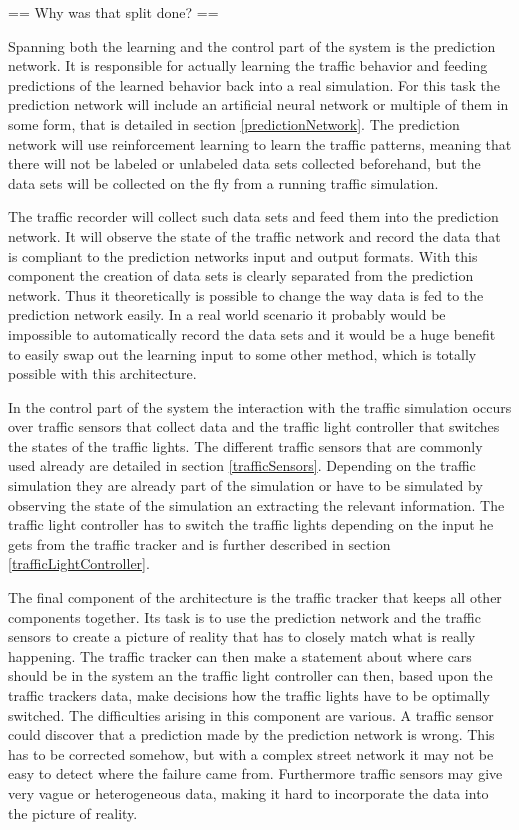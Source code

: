== Why was that split done? ==

Spanning both the learning and the control part of the system is the prediction network. It is responsible for actually learning the traffic behavior and feeding predictions of the learned behavior back into a real simulation. For this task the prediction network will include an artificial neural network or multiple of them in some form, that is detailed in section \ref{predictionNetwork}. The prediction network will use reinforcement learning to learn the traffic patterns, meaning that there will not be labeled or unlabeled data sets collected beforehand, but the data sets will be collected on the fly from a running traffic simulation.

The traffic recorder will collect such data sets and feed them into the prediction network. It will observe the state of the traffic network and record the data that is compliant to the prediction networks input and output formats. With this component the creation of data sets is clearly separated from the prediction network. Thus it theoretically is possible to change the way data is fed to the prediction network easily. In a real world scenario it probably would be impossible to automatically record the data sets and it would be a huge benefit to easily swap out the learning input to some other method, which is totally possible with this architecture.

In the control part of the system the interaction with the traffic simulation occurs over traffic sensors that collect data and the traffic light controller that switches the states of the traffic lights. The different traffic sensors that are commonly used already are detailed in section \ref{trafficSensors}. Depending on the traffic simulation they are already part of the simulation or have to be simulated by observing the state of the simulation an extracting the relevant information. The traffic light controller has to switch the traffic lights depending on the input he gets from the traffic tracker and is further described in section \ref{trafficLightController}.

The final component of the architecture is the traffic tracker that keeps all other components together. Its task is to use the prediction network and the traffic sensors to create a picture of reality that has to closely match what is really happening. The traffic tracker can then make a statement about where cars should be in the system an the traffic light controller can then, based upon the traffic trackers data, make decisions how the traffic lights have to be optimally switched. The difficulties arising in this component are various. A traffic sensor could discover that a  prediction made by the prediction network is wrong. This has to be corrected somehow, but with a complex street network it may not be easy to detect where the failure came from. Furthermore traffic sensors may give very vague or heterogeneous data, making it hard to incorporate the data into the picture of reality.

